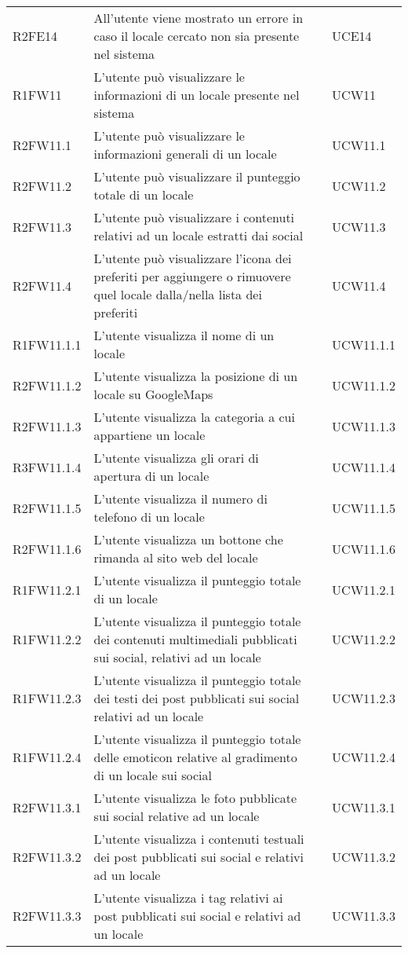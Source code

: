 \begin{longtable}{ m{}<{\centering}  m{}<{\centering}  m{}<{\centering}  m{}<{\centering}}
	R2FE14 & All’utente viene mostrato un errore in caso il locale cercato non sia presente nel sistema & \De & UCE14\\	 
	 	 
	R1FW11 & L’utente può visualizzare le informazioni di un locale presente nel sistema & \Ob & UCW11\\	

	R2FW11.1 & L’utente può visualizzare le informazioni generali di un locale & \De & UCW11.1 \\
	R2FW11.2 & L’utente può visualizzare il punteggio totale di un locale & \De & UCW11.2 \\
	R2FW11.3 & L’utente può visualizzare i contenuti relativi ad un locale estratti dai social & \De & UCW11.3 \\
	R2FW11.4 & L’utente può visualizzare l’icona dei preferiti per aggiungere o rimuovere quel locale dalla/nella lista dei preferiti & \De & UCW11.4 \\

	R1FW11.1.1 & L’utente visualizza il nome di un locale & \Ob & UCW11.1.1 \\
	R2FW11.1.2 & L’utente visualizza la posizione di un locale su GoogleMaps & \De & UCW11.1.2 \\
	R2FW11.1.3 & L’utente visualizza la categoria a cui appartiene un locale & \De & UCW11.1.3 \\
	R3FW11.1.4 & L’utente visualizza gli orari di apertura di un locale & \Fa & UCW11.1.4 \\
	R2FW11.1.5 & L’utente visualizza il numero di telefono di un locale & \De & UCW11.1.5 \\
	R2FW11.1.6 & L’utente visualizza un bottone che rimanda al sito web del locale & \De & UCW11.1.6 \\

	R1FW11.2.1 & L’utente visualizza il punteggio totale di un locale & \Ob & UCW11.2.1 \\
	R1FW11.2.2 & L’utente visualizza il punteggio totale dei contenuti multimediali pubblicati sui social, relativi ad un locale & \Ob & UCW11.2.2 \\
	R1FW11.2.3 & L’utente visualizza il punteggio totale dei testi dei post pubblicati sui social relativi ad un locale & \Ob & UCW11.2.3 \\
	R1FW11.2.4 & L’utente visualizza il punteggio totale delle emoticon relative al gradimento di un locale sui social & \Ob & UCW11.2.4 \\

	R2FW11.3.1 & L’utente visualizza le foto pubblicate sui social relative ad un locale & \De & UCW11.3.1 \\
	R2FW11.3.2 & L’utente visualizza i contenuti testuali dei post pubblicati sui social e relativi ad un locale & \De & UCW11.3.2 \\
	R2FW11.3.3 & L’utente visualizza i tag relativi ai post pubblicati sui social e relativi ad un locale & \De & UCW11.3.3 \\ 	 	 	


\end{longtable}
